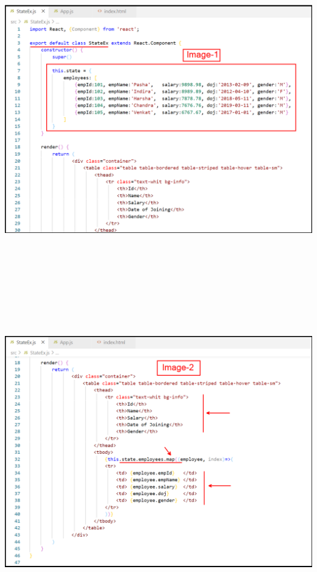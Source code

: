 \documentclass{article}
\begin{document}
\begin{center}
	\noindent \includegraphics*[width=5.99in, height=6.45in]{IMG-09-11}
\end{center}

\noindent 

\begin{center}
	\noindent \includegraphics*[width=5.93in, height=4.54in]{IMG-09-12}
\end{center}
\end{document}
